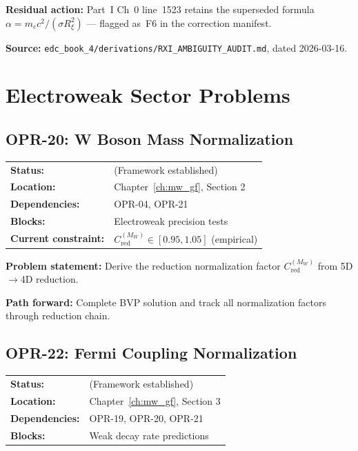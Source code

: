 \textbf{Residual action:} Part~I Ch~0 line~1523 retains the superseded formula
$\alpha = m_e c^2 / (\sigma R_\xi^2)$ --- flagged as~F6 in the correction manifest.

\textbf{Source:} \texttt{edc\_book\_4/derivations/RXI\_AMBIGUITY\_AUDIT.md},
dated 2026-03-16.

\bigskip

\section{Electroweak Sector Problems}

\subsection*{OPR-20: W Boson Mass Normalization}
\begin{tabular}{ll}
\textbf{Status:} & \tagOpen{} (Framework established) \\
\textbf{Location:} & Chapter~\ref{ch:mw_gf}, Section 2 \\
\textbf{Dependencies:} & OPR-04, OPR-21 \\
\textbf{Blocks:} & Electroweak precision tests \\
\textbf{Current constraint:} & $C_{\text{red}}^{(M_W)} \in [0.95, 1.05]$ (empirical) \\
\end{tabular}

\textbf{Problem statement:} Derive the reduction normalization factor
$C_{\text{red}}^{(M_W)}$ from 5D$\to$4D reduction.

\textbf{Path forward:} Complete BVP solution and track all normalization
factors through reduction chain.

\bigskip

\subsection*{OPR-22: Fermi Coupling Normalization}
\begin{tabular}{ll}
\textbf{Status:} & \tagOpen{} (Framework established) \\
\textbf{Location:} & Chapter~\ref{ch:mw_gf}, Section 3 \\
\textbf{Dependencies:} & OPR-19, OPR-20, OPR-21 \\
\textbf{Blocks:} & Weak decay rate predictions \\
\end{tabular}


